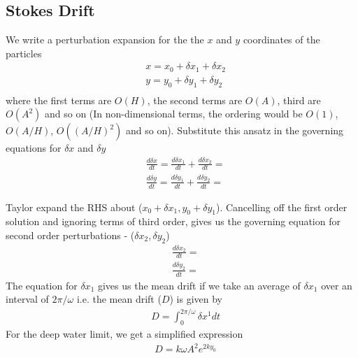 \documentclass[11pt,a4paper]{article}
\newcommand{\dl}{\delta}
\newcommand{\1}{\vect{1}}
\begin{document}
\subsection{Stokes Drift}

We write a perturbation expansion for the the $x$ and $y$ coordinates of the particles
\begin{align*}
&x = x_0 + \dl x_1 + \dl x_2\\
&y = y_0 + \dl y_1 + \dl y_2\\
\end{align*}
where the first terms are $O(H)$, the second terms are $O(A)$, third are $O(A^2)$ and so on (In non-dimensional terms, the ordering would be $O(1)$, $O(A/H)$, $O((A/H)^2)$ and so on). Substitute this ansatz in the governing equations for $\dl x$ and $\dl y$
\begin{align*}
&\frac{d\dl x}{dt} = \frac{d\dl x_1}{dt} + \frac{d\dl x_2}{dt} = \\
&\frac{d\dl y}{dt} = \frac{d\dl y_1}{dt} + \frac{d\dl y_2}{dt} = 
\end{align*}

Taylor expand the RHS about ($x_0 + \dl x_1, y_0 + \dl y_1$). Cancelling off the first order solution and ignoring terms of third order, gives us the governing equation for second order perturbations - ($\dl x_2, \dl y_2$)
\begin{align*}
&\frac{d\dl x_2}{dt} = \\
&\frac{d\dl y_2}{dt} = 
\end{align*}
The equation for $\dl x_1$ gives us the mean drift if we take an average of $\dl x_1$ over an interval of $2\pi/\omega$ i.e. the mean drift ($D$) is given by
\begin{align*}
&D = \int_0^{2\pi/\omega}\dl x^1 dt
\end{align*}
For the deep water limit, we get a simplified expression
\begin{align*}
&D = k\omega A^2 e^{2ky_0}
\end{align*}
\end{document}
